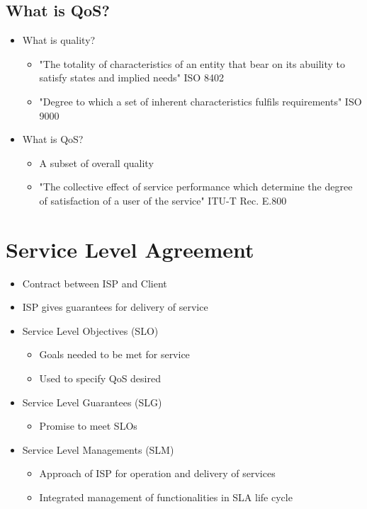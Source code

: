 \documentclass[a4paper]{article}
\begin{document}
\subsection{What is QoS?}
\begin{itemize}
	\item What is quality?
	\begin{itemize}
		\item "The totality of characteristics of an entity that bear on
			its abuility to satisfy states and implied needs" ISO
			8402
		\item "Degree to which a set of inherent characteristics fulfils
			requirements" ISO 9000
	\end{itemize}
	\item What is QoS?
	\begin{itemize}
		\item A subset of overall quality
		\item "The collective effect of service performance which
			determine the degree of satisfaction of a user of the
			service" ITU-T Rec. E.800
	\end{itemize}
\end{itemize}

\section{Service Level Agreement}
\begin{itemize}
	\item Contract between ISP and Client
	\item ISP gives guarantees for delivery of service
	\item Service Level Objectives (SLO)
	\begin{itemize}
		\item Goals needed to be met for service
		\item Used to specify QoS desired
	\end{itemize}
	\item Service Level Guarantees (SLG)
	\begin{itemize}
		\item Promise to meet SLOs
	\end{itemize}
	\item Service Level Managements (SLM)
	\begin{itemize}
		\item Approach of ISP for operation and delivery of services
		\item Integrated management of functionalities in SLA life cycle
	\end{itemize}
\end{itemize}
\end{document}

